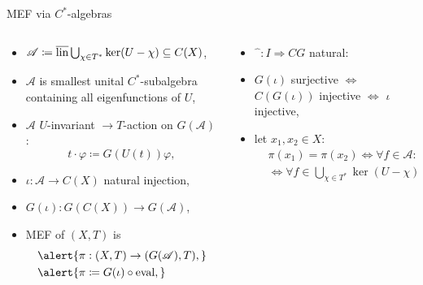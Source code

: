 \begin{frame}[fragile]{MEF via $C^*$-algebras}
  \begin{columns}[t]
    \begin{column}{0.5\textwidth}
     \begin{itemize}
       \item $\mathscr{A}\coloneq \overline{\operatorname{lin}} \bigcup_{\chi \in T^*} \ker (U- \chi) \subseteq C(X)$,
    \item  $\mathscr{A}$ is smallest unital $C^*$-subalgebra containing all eigenfunctions of $U$,
   \item \pause
      $\mathscr{A}$ $U$-invariant $\rightarrow T$-action on $G(\mathscr{A})$:
      \begin{equation*}
      t\cdot \varphi \coloneq G(U(t))\varphi,
      \end{equation*}
    \item \pause $\iota : \mathscr{A} \to C(X)$ natural injection,
    \item $G(\iota)  : G(C(X)) \to G(\mathscr{A})$,
    \item \alert{MEF of $(X,T)$ is}
      \begin{equation*}
        \begin{split}
          &\alert{\pi : (X,T) \to (G(\mathscr{A}),T),}\\ 
          &\alert{\pi \coloneq G(\iota) \circ \ev,}
        \end{split}
      \end{equation*}
        \end{itemize}
    \end{column}
    \begin{column}{0.5 \textwidth}
 \begin{itemize}
 \item \pause $\widehat{\phantom{a}}: I \Rightarrow CG$ natural:
   \item \pause
          $G(\iota)$ surjective $\Leftrightarrow$ $C (G( \iota ))$ injective $\Leftrightarrow$ $\iota$ injective,
    \item \pause let $x_1, x_2 \in X$:
      \begin{equation*}
        \begin{split}
          &\pi (x_1) = \pi (x_2) \Leftrightarrow \forall f \in \mathscr{A} : f(x_1) = f(x_2) \\
          &\Leftrightarrow \forall f \in \bigcup_{\chi \in T^*} \ker (U- \chi)  : f(x_1) = f(x_2).
        \end{split}
    \end{equation*}
        \end{itemize}
    \end{column}
  \end{columns}
  \end{frame}

